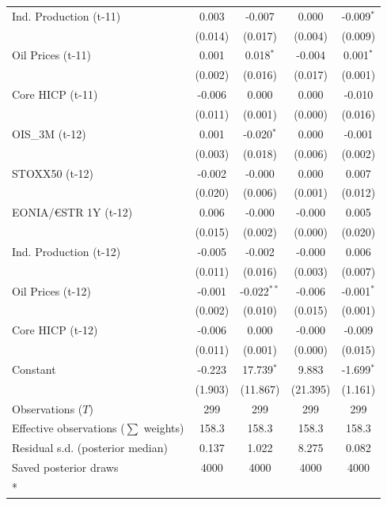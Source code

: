 \begin{longtable}[t]{lcccc}
Ind. Production (t-11) & 0.003 & -0.007 & 0.000 & -0.009$^{*}$\\
 & (0.014) & (0.017) & (0.004) & (0.009)\\
Oil Prices (t-11) & 0.001 & 0.018$^{*}$ & -0.004 & 0.001$^{*}$\\
 & (0.002) & (0.016) & (0.017) & (0.001)\\
Core HICP (t-11) & -0.006 & 0.000 & 0.000 & -0.010\\
 & (0.011) & (0.001) & (0.000) & (0.016)\\
OIS\_3M (t-12) & 0.001 & -0.020$^{*}$ & 0.000 & -0.001\\
 & (0.003) & (0.018) & (0.006) & (0.002)\\
STOXX50 (t-12) & -0.002 & -0.000 & 0.000 & 0.007\\
 & (0.020) & (0.006) & (0.001) & (0.012)\\
EONIA/€STR 1Y (t-12) & 0.006 & -0.000 & -0.000 & 0.005\\
 & (0.015) & (0.002) & (0.000) & (0.020)\\
Ind. Production (t-12) & -0.005 & -0.002 & -0.000 & 0.006\\
 & (0.011) & (0.016) & (0.003) & (0.007)\\
Oil Prices (t-12) & -0.001 & -0.022$^{**}$ & -0.006 & -0.001$^{*}$\\
 & (0.002) & (0.010) & (0.015) & (0.001)\\
Core HICP (t-12) & -0.006 & 0.000 & -0.000 & -0.009\\
 & (0.011) & (0.001) & (0.000) & (0.015)\\
Constant & -0.223 & 17.739$^{*}$ & 9.883 & -1.699$^{*}$\\
 & (1.903) & (11.867) & (21.395) & (1.161)\\
\midrule
Observations ($T$) & 299 & 299 & 299 & 299\\
Effective observations ($\sum$ weights) & 158.3 & 158.3 & 158.3 & 158.3\\
Residual s.d. (posterior median) & 0.137 & 1.022 & 8.275 & 0.082\\
Saved posterior draws & 4000 & 4000 & 4000 & 4000\\*
\end{longtable}
\endgroup{}

